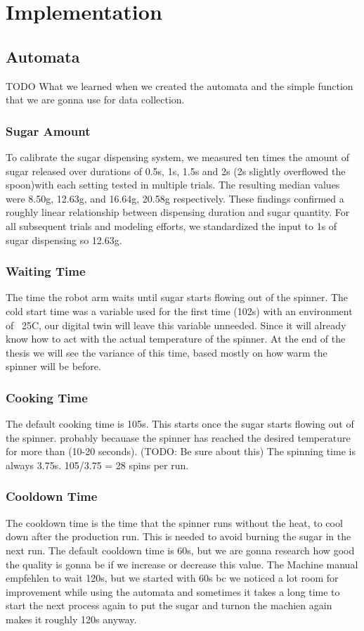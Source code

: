 \chapter{Implementation}
\label{sec:implementation}

\section{Automata}
TODO What we learned when we created the automata and the simple function that we are gonna use for data collection.

\subsection{Sugar Amount}\label{subsec:sugar-amount}
To calibrate the sugar dispensing system, we measured ten times the amount of sugar released over durations of 0.5s, 1s, 1.5s and 2s (2s slightly overflowed the spoon)with each setting tested in multiple trials. The resulting median values were 8.50g, 12.63g, and 16.64g, 20.58g respectively. These findings confirmed a roughly linear relationship between dispensing duration and sugar quantity. For all subsequent trials and modeling efforts, we standardized the input to 1s of sugar dispensing so 12.63g.

\subsection{Waiting Time}
The time the robot arm waits until sugar starts flowing out of the spinner. The cold start time was a variable used for the first time (102s) with an environment of ~25C, our digital twin will leave this variable unneeded. Since it will already know how to act with the actual temperature of the spinner.
At the end of the thesis we will see the variance of this time, based mostly on how warm the spinner will be before.

\subsection{Cooking Time}
The default cooking time is 105s. This starts once the sugar starts flowing out of the spinner. probably becauase the spinner has reached the desired temperature for more than (10-20 seconds). (TODO: Be sure about this)
The spinning time is always 3.75s.
105/3.75 = 28 spins per run.

\subsection{Cooldown Time}
The cooldown time is the time that the spinner runs without the heat, to cool down after the production run. This is needed to avoid burning the sugar in the next run. The default cooldown time is 60s, but we are gonna research how good the quality is gonna be if we increase or decrease this value. 
The Machine manual empfehlen to wait 120s, but we started with 60s bc we noticed a lot room for improvement while using the automata and sometimes it takes a long time to start the next process again to put the sugar and turnon the machien again makes it roughly 120s anyway.

